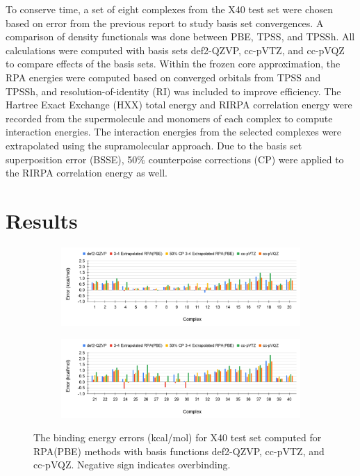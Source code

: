 \documentclass[11pt]{article}
\begin{document}
To conserve time, a set of eight complexes from the X40 test set were
chosen based on error from the previous report to study basis set
convergences. A comparison of density functionals was done between
PBE, TPSS, and TPSSh. All calculations were computed with basis sets def2-QZVP,
cc-pVTZ, and cc-pVQZ to compare effects of the basis sets. Within the frozen core approximation,
the RPA energies were computed based on converged orbitals from TPSS and TPSSh, and
resolution-of-identity (RI) was included to improve efficiency. The Hartree
Exact Exchange (HXX) total energy and RIRPA correlation energy were
recorded from the supermolecule and monomers of each complex to compute
interaction energies. The interaction energies from the selected complexes
were extrapolated using the supramolecular approach. Due to the basis set
superposition error (BSSE), 50$\%$ counterpoise corrections (CP) were
applied to the RIRPA correlation energy as well.

\section{Results}

\begin{figure}[H]
  \centering
  \begin{subfigure}{\textwidth}
    \center
    \includegraphics[scale=0.35]{def2-QZVP_1.png}
    \label{fig:def2-QZVP_1}
  \end{subfigure}
  \begin{subfigure}{\textwidth}
    \center
    \includegraphics[scale=0.35]{def2-QZVP_2.png}
    \label{fig:def2-QZVP_2}
  \end{subfigure}
  \caption{The binding energy errors (kcal/mol) for X40 test set computed
    for RPA(PBE) methods with basis functions def2-QZVP, cc-pVTZ, and
    cc-pVQZ. Negative sign indicates overbinding.}
  \label{fig:def2-QZVP Error}
\end{figure}
\end{document}
